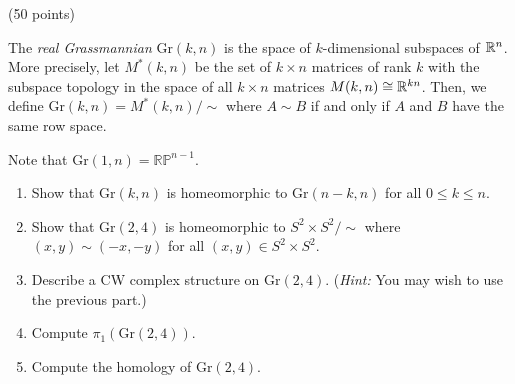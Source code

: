 \documentclass[12pt]{article}
\begin{document}
\begin{problem}{2}(50 points) 
\begin{defn}
    The \emph{real Grassmannian}  $\mathrm{Gr}(k,n)$ is the space of $k$-dimensional subspaces of $\mathbb R^n$. More precisely, let $M^*(k,n)$ be the set of $k \times n$ matrices of rank $k$ with the subspace topology in the space of all $k \times n$ matrices $M(k,n) \cong \mathbb R^{kn}$. Then, we define $\mathrm{Gr}(k,n) = M^*(k,n)/\sim$ where $A \sim B$ if and only if $A$ and $B$ have the same row space. 
\end{defn}
    Note that $\mathrm{Gr}(1,n) = \mathbb{RP}^{n-1}$. 
    \begin{enumerate}
    \item Show that $\mathrm{Gr}(k,n)$ is homeomorphic to $\mathrm{Gr}(n-k,n)$ for all $0 \leq k \leq n$.
    \item Show that $\mathrm{Gr}(2,4)$ is homeomorphic to $S^2 \times S^2/\sim$ where $(x,y) \sim (-x, -y)$ for all $(x,y) \in S^2 \times S^2$. 
    \item Describe a CW complex structure on $\mathrm{Gr}(2,4)$. (\emph{Hint:} You may wish to use the previous part.)
    \item Compute $\pi_1(\mathrm{Gr}(2,4))$. 
    \item Compute the homology of $\mathrm{Gr}(2,4)$. 
    \end{enumerate}
\end{problem}
\newpage
\end{document}
